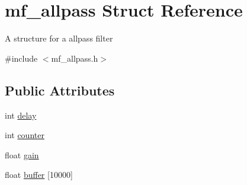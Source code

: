\hypertarget{structmf__allpass}{}\section{mf\+\_\+allpass Struct Reference}
\label{structmf__allpass}


A structure for a allpass filter ~\newline
  




{\ttfamily \#include $<$mf\+\_\+allpass.\+h$>$}

\subsection*{Public Attributes}
\begin{DoxyCompactItemize}
\item 
int \mbox{\hyperlink{structmf__allpass_a016ac476fe7e954a488af64836957787}{delay}}
\item 
int \mbox{\hyperlink{structmf__allpass_af88b9d534b3acdede269705d2b676181}{counter}}
\item 
float \mbox{\hyperlink{structmf__allpass_a81de95ecaee64df89e8682eee2284ffe}{gain}}
\item 
float \mbox{\hyperlink{structmf__allpass_a0673579a16b38b77d5761459bd3aaf14}{buffer}} \mbox{[}10000\mbox{]}
\end{DoxyCompactItemize}
